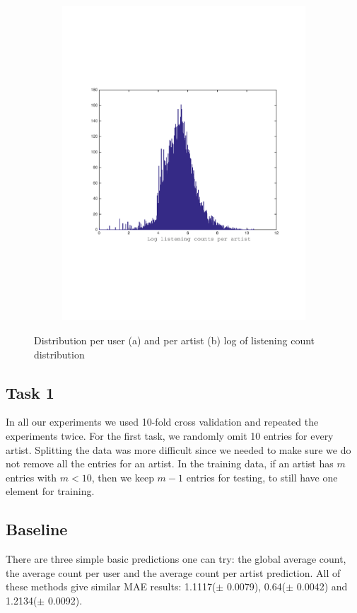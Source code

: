 \begin{figure}[h]
\begin{subfigure}[b]{0.45\textwidth}
    \includegraphics[width=\textwidth]{figures/histCountPerArtist.pdf}
    \caption{}
  \end{subfigure}
  \caption{Distribution per user (a) and per artist (b) log of listening count distribution}
  \label{fig:user_artist_distribution}
\end{figure}

 
\subsection{Task 1}
In all our experiments we used 10-fold cross validation and repeated the experiments twice. For the first task, we randomly omit 10 entries for every artist. Splitting the data was more difficult since we needed to make sure we do not remove all the entries for an artist. In the training data, if an artist has $m$ entries with $m < 10$, then we keep $m-1$ entries for testing, to still have one element for training.
 
 
\subsection{Baseline}
There are three simple basic predictions one can try: the global average count, the average count per user and the average count per artist prediction. All of these methods give similar MAE results:  1.1117($\pm$ 0.0079), 0.64($\pm$ 0.0042) and 1.2134($\pm$ 0.0092). 

